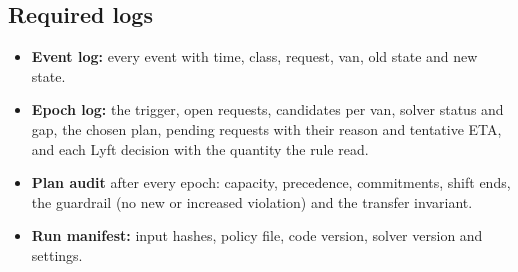 \documentclass[11pt,letterpaper]{article}
\begin{document}
\subsection{Required logs}
\begin{itemize}
\item \textbf{Event log:} every event with time, class, request, van, old state and new state.
\item \textbf{Epoch log:} the trigger, open requests, candidates per van, solver status and gap, the chosen plan, pending requests with their reason and tentative ETA, and each Lyft decision with the quantity the rule read.
\item \textbf{Plan audit} after every epoch: capacity, precedence, commitments, shift ends, the guardrail (no new or increased violation) and the transfer invariant.
\item \textbf{Run manifest:} input hashes, policy file, code version, solver version and settings.
\end{itemize}
\end{document}
